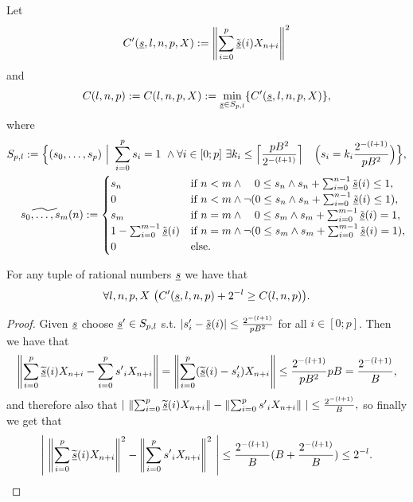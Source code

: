 \begin{dfn}[$C$]\label{d:C}  
Let \[ C'(\underline s, l,n,p, X) := \left\|\sum^{p}_{i=0} \tilde {\underline s}(i)X_{n+i}\right\|^2 \] and
\[
C(l,n,p) := C(l,n,p, X) := \min_{\underline s\in S_{p,l}}\{ C'(\underline s,l,n,p,X)\},
\] where
\begin{align*}
S_{p,l}:=\Big\{(s_0,\ldots,s_p)\ \Big|%
\ \sum^{p}_{i=0} s_i = 1 \ \wedge
 \forall i\in [0;p]\ \exists k_i\leq \Big\lceil\frac{pB^2}{2^{-(l+1)}}\Big\rceil\quad\Big( s_i=k_i\frac{2^{-(l+1)}}{pB^2}\Big)\Big\},\\
 \widetilde {s_0,\ldots,s_m}(n) := \begin{cases}
s_n&\Tif\ n< m\wedge \ \ \ 0\leq s_n \wedge s_n+\sum^{n-1}_{i=0} \tilde {\tup s}(i) \leq 1,\\
0&\Tif\ n< m\wedge \neg(   0\leq s_n \wedge s_n+\sum^{n-1}_{i=0} \tilde {\tup s}(i) \leq 1),\\
s_m&\Tif\ n= m\wedge \ \ \  0\leq s_m \wedge s_m+\sum^{m-1}_{i=0} \tilde {\tup s}(i) = 1,\\
1 - \sum^{m-1}_{i=0} \tilde{\tup s}(i)&\Tif\ n= m\wedge \neg(  0\leq s_m \wedge s_m+\sum^{m-1}_{i=0} \tilde {\tup s}(i) = 1),\\
0&\Telse.
\end{cases}\\
\end{align*}
\end{dfn}
\begin{lemma}\label{l:newC}
For any tuple of rational numbers $\underline s$ we have that
\[
\forall l,n,p,X\ \big( C'(\underline s,l,n,p)+2^{-l}\geq C(l,n,p) \big).
\]
\end{lemma}
\begin{proof}
Given $\underline s$ choose $\underline s'\in S_{p,l}$ s.t. $|s'_i-\tilde {\underline s}(i)|\leq \frac{2^{-(l+1)}}{pB^2}$ for all $i\in[0;p]$. 
Then we have that
\begin{align*}
\left\|\sum_{i=0}^{p} \widetilde{\underline s}(i) X_{n+i} - \sum_{i=0}^{p} {s'}_i X_{n+i}\right\| = 
\left\|\sum_{i=0}^{p} (\widetilde{\underline s}(i)-s'_i) X_{n+i} \right\| \leq
\frac{2^{-(l+1)}}{pB^2}pB = \frac{2^{-(l+1)}}{B},
\end{align*}
and therefore also that
$
\left|\ \left\|\sum_{i=0}^{p} \widetilde{\underline s}(i) X_{n+i}\right\| - \left\|\sum_{i=0}^{p} {s'}_i X_{n+i}\right\| \ \right|\leq\frac{2^{-(l+1)}}{B},
$
so finally we get that
\[
\left|\ \left\|\sum_{i=0}^{p} \widetilde{\underline s}(i) X_{n+i}\right\|^2 - \left\|\sum_{i=0}^{p} {s'}_i X_{n+i}\right\|^2\  \right| \leq \frac{2^{-(l+1)}}{B} ( B + \frac{2^{-(l+1)}}{B} ) \leq 2^{-l}.
\]
\end{proof}

